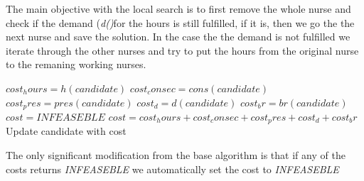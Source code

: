 \documentclass[11pt]{article}
\begin{document}
The main objective with the local search is to first remove the whole nurse and check if the demand (\textit{d()}for the hours is still fulfilled, if it is, then we go the the next nurse and save the solution. In the case the the demand is not fulfilled we iterate through the other nurses and try to put the hours from the original nurse to the remaning working nurses.
\newline
\begin{algorithmic}
		\State $cost_hours=h(candidate)$
		\State $cost_consec=cons(candidate)$
		\State $cost_pres=pres(candidate)$
		\State $cost_d=d(candidate)$
		\State $cost_br=br(candidate)$
			\State $cost=INFEASEBLE$
		\Else
			\State $cost=cost_hours + cost_consec + cost_pres + cost_d + cost_br$
		\EndIf
		\State Update candidate with cost
	\EndFor	
\EndProcedure
\end{algorithmic}
The only significant modification from the base algorithm is that if any of the costs returns \textit{INFEASEBLE} we automatically set the cost to \textit{INFEASEBLE}
\end{document}
